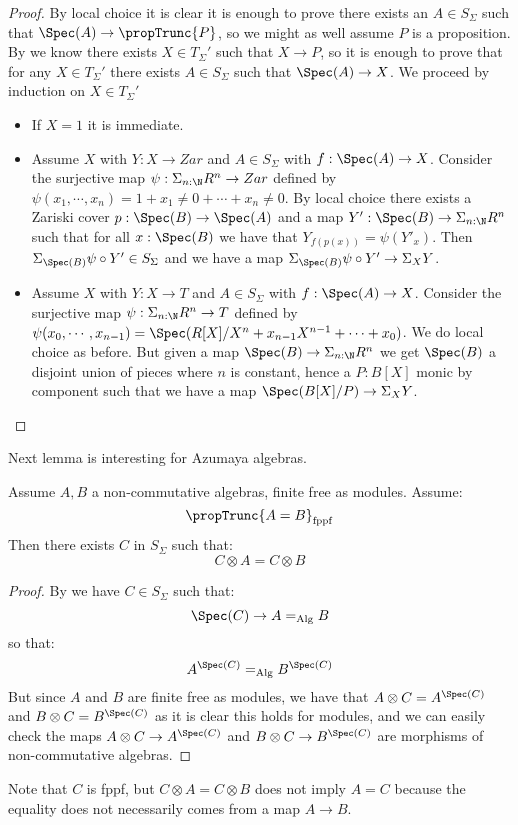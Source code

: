 \begin{proof}
By local choice it is clear it is enough to prove there exists an $A\in S_\Sigma$ such that $\Spec(A)\to \propTrunc{P}$, so we might as well assume $P$ is a proposition. By  we know there exists $X\in T_\Sigma'$ such that $X\to P$, so it is enough to prove that for any $X\in T_\Sigma'$ there exists $A\in S_\Sigma$ such that $\Spec(A)\to X$. We proceed by induction on $X\in T_\Sigma'$
\begin{itemize}
\item If $X=1$ it is immediate. 

\item Assume $X$ with $Y:X\to Zar$ and $A\in S_\Sigma$ with $f:\Spec(A)\to X$. Consider the surjective map $\psi : \Sigma_{n:\N}R^n\to Zar$ defined by $\psi(x_1,\cdots,x_n) = 1 + x_1\not=0 +\cdots + x_n\not=0$. By local choice there exists a Zariski cover $p:\Spec(B)\to \Spec(A)$ and a map $Y':\Spec(B)\to \Sigma_{n:\N}R^n$ such that for all $x:\Spec(B)$ we have that $Y_{f(p(x))} = \psi(Y'_x)$. Then $\Sigma_{\Spec(B)} \psi\circ Y' \in S_\Sigma$ and we have a map $\Sigma_{\Spec(B)} \psi\circ Y'\to \Sigma_XY$.

\item Assume $X$ with $Y:X\to T$ and $A\in S_\Sigma$ with $f:\Spec(A)\to X$. Consider the surjective map $\psi : \Sigma_{n:\N}R^n\to T$ defined by $\psi(x_0,\cdots,x_{n-1}) = \Spec(R[X]/X^n+x_{n-1}X^{n-1}+\cdots+x_0)$. We do local choice as before. But given a map $\Spec(B)\to \Sigma_{n:\N}R^n$ we get $\Spec(B)$ a disjoint union of pieces where $n$ is constant, hence a $P:B[X]$ monic by component such that we have a map $\Spec(B[X]/P) \to \Sigma_XY$.
\end{itemize}
\end{proof}

Next lemma is interesting for Azumaya algebras.

\begin{lemma}
Assume $A,B$ a non-commutative algebras, finite free as modules. Assume:
\[\propTrunc{A=B}_{\mathrm{fppf}}\]
Then there exists $C$ in $S_\Sigma$ such that:
\[C\otimes A = C\otimes B\]
\end{lemma}

\begin{proof}
By  we have $C\in S_\Sigma$ such that:
\[\Spec(C)\to A=_{\mathrm{Alg}}B\]
so that:
\[A^{\Spec(C)} =_{\mathrm{Alg}} B^{\Spec(C)}\]
But since $A$ and $B$ are finite free as modules, we have that $A\otimes C = A^{\Spec(C)}$ and $B\otimes C = B^{\Spec(C)}$ as it is clear this holds for modules, and we can easily check the maps $A\otimes C\to A^{\Spec(C)}$ and $B\otimes C\to B^{\Spec(C)}$ are morphisms of non-commutative algebras.
\end{proof}

\begin{remark}
Note that $C$ is fppf, but $C\otimes A=C\otimes B$ does not imply $A=C$ because the equality does not necessarily comes from a map $A\to B$.
\end{remark}



